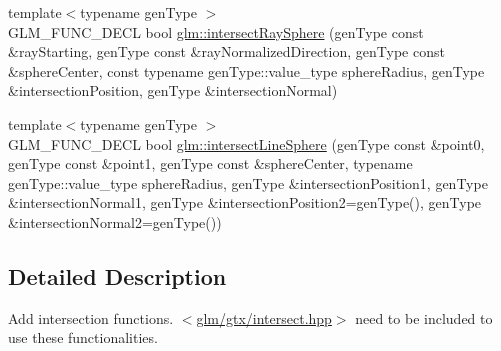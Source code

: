 \begin{DoxyCompactItemize}
\item 
{\footnotesize template$<$typename gen\-Type $>$ }\\G\-L\-M\-\_\-\-F\-U\-N\-C\-\_\-\-D\-E\-C\-L bool \hyperlink{group__gtx__intersect_gad28c00515b823b579c608aafa1100c1d}{glm\-::intersect\-Ray\-Sphere} (gen\-Type const \&ray\-Starting, gen\-Type const \&ray\-Normalized\-Direction, gen\-Type const \&sphere\-Center, const typename gen\-Type\-::value\-\_\-type sphere\-Radius, gen\-Type \&intersection\-Position, gen\-Type \&intersection\-Normal)
\item 
{\footnotesize template$<$typename gen\-Type $>$ }\\G\-L\-M\-\_\-\-F\-U\-N\-C\-\_\-\-D\-E\-C\-L bool \hyperlink{group__gtx__intersect_ga9c68139f3d8a4f3d7fe45f9dbc0de5b7}{glm\-::intersect\-Line\-Sphere} (gen\-Type const \&point0, gen\-Type const \&point1, gen\-Type const \&sphere\-Center, typename gen\-Type\-::value\-\_\-type sphere\-Radius, gen\-Type \&intersection\-Position1, gen\-Type \&intersection\-Normal1, gen\-Type \&intersection\-Position2=gen\-Type(), gen\-Type \&intersection\-Normal2=gen\-Type())
\end{DoxyCompactItemize}


\subsection{Detailed Description}
Add intersection functions. $<$\hyperlink{intersect_8hpp}{glm/gtx/intersect.\-hpp}$>$ need to be included to use these functionalities. 

